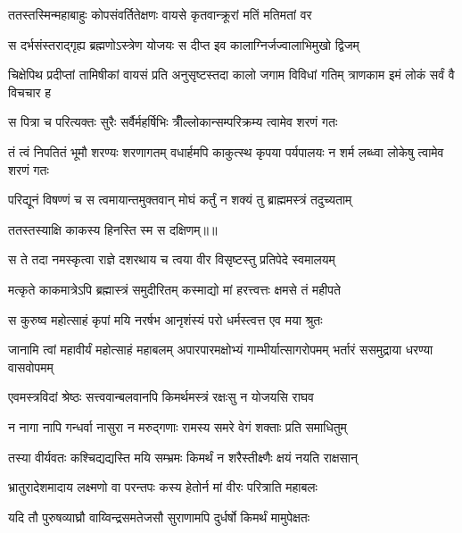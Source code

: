 \twolineshloka
{ततस्तस्मिन्महाबाहुः कोपसंवर्तितेक्षणः}
{वायसे कृतवान्क्रूरां मतिं मतिमतां वर} %

\twolineshloka
{स दर्भसंस्तराद्गृह्य ब्रह्मणोऽस्त्रेण योजयः}
{स दीप्त इव कालाग्निर्जज्वालाभिमुखो द्विजम्} %

\threelineshloka
{चिक्षेपिथ प्रदीप्तां तामिषीकां वायसं प्रति}
{अनुसृष्टस्तदा कालो जगाम विविधां गतिम्}
{त्राणकाम इमं लोकं सर्वं वै विचचार ह} %

\twolineshloka
{स पित्रा च परित्यक्तः सुरैः सर्वैर्महर्षिभिः}
{त्रीँल्लोकान्सम्परिक्रम्य त्वामेव शरणं गतः} %

\threelineshloka
{तं त्वं निपतितं भूमौ शरण्यः शरणागतम्}
{वधार्हमपि काकुत्स्थ कृपया पर्यपालयः}
{न शर्म लब्ध्वा लोकेषु त्वामेव शरणं गतः} %

\twolineshloka
{परिद्यूनं विषण्णं च स त्वमायान्तमुक्तवान्}
{मोघं कर्तुं न शक्यं तु ब्राह्ममस्त्रं तदुच्यताम्} %

{ततस्तस्याक्षि काकस्य हिनस्ति स्म स दक्षिणम्॥॥} %

\addtocounter{shlokacount}{1}

\twolineshloka
{स ते तदा नमस्कृत्वा राज्ञे दशरथाय च}
{त्वया वीर विसृष्टस्तु प्रतिपेदे स्वमालयम्} %

\twolineshloka
{मत्कृते काकमात्रेऽपि ब्रह्मास्त्रं समुदीरितम्}
{कस्माद्यो मां हरत्त्वत्तः क्षमसे तं महीपते} %

\twolineshloka
{स कुरुष्व महोत्साहं कृपां मयि नरर्षभ}
{आनृशंस्यं परो धर्मस्त्वत्त एव मया श्रुतः} %

\threelineshloka
{जानामि त्वां महावीर्यं महोत्साहं महाबलम्}
{अपारपारमक्षोभ्यं गाम्भीर्यात्सागरोपमम्}
{भर्तारं ससमुद्राया धरण्या वासवोपमम्} %

\twolineshloka
{एवमस्त्रविदां श्रेष्ठः सत्त्ववान्बलवानपि}
{किमर्थमस्त्रं रक्षःसु न योजयसि राघव} %

\twolineshloka
{न नागा नापि गन्धर्वा नासुरा न मरुद्गणाः}
{रामस्य समरे वेगं शक्ताः प्रति समाधितुम्} %

\twolineshloka
{तस्या वीर्यवतः कश्चिद्यद्यस्ति मयि सम्भ्रमः}
{किमर्थं न शरैस्तीक्ष्णैः क्षयं नयति राक्षसान्} %

\twolineshloka
{भ्रातुरादेशमादाय लक्ष्मणो वा परन्तपः}
{कस्य हेतोर्न मां वीरः परित्राति महाबलः} %

\twolineshloka
{यदि तौ पुरुषव्याघ्रौ वाय्विन्द्रसमतेजसौ}
{सुराणामपि दुर्धर्षो किमर्थं मामुपेक्षतः} %

